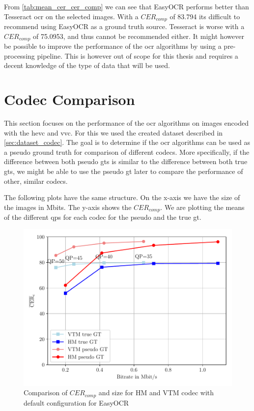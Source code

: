 From \autoref{tab:mean_cer_cer_comp} we can see that EasyOCR performs better than Tesseract \gls{ocr} on the selected images.
With a $CER_{comp}$ of 83.794 its difficult to recommend using EasyOCR as a ground truth source.
Tesseract is worse with a $CER_{comp}$ of 75.0953, and thus cannot be recommended either.
It might however be possible to improve the performance of the \gls{ocr} algorithms by using a pre-processing pipeline.
This is however out of scope for this thesis and requires a decent knowledge of the type of data that will be used.

\section{Codec Comparison}
\label{sec:codec_comparison}

This section focuses on the performance of the \gls{ocr} algorithms on images encoded with the \gls{hevc} and \gls{vvc}.
For this we used the created dataset described in \autoref{sec:dataset_codec}.
The goal is to determine if the \gls{ocr} algorithms can be used as a pseudo ground truth for comparison of different codecs.
More specifically, if the difference between both pseudo \glspl{gt} is similar to the difference between both true \glspl{gt}, we might be able to use the pseudo \gls{gt} later to compare the performance of other, similar codecs.

The following plots have the same structure.
On the x-axis we have the size of the images in Mbits.
The y-axis shows the $CER_{comp}$.
We are plotting the means of the different \glspl{qp} for each codec for the pseudo and the true \gls{gt}.


\begin{figure}[h]
    \centering
    \includegraphics[width=\textwidth]{../images/analyze/codec_cer_size_ezocr_default.pdf}
    \caption{Comparison of $CER_{comp}$ and size for HM and VTM codec with default configuration for EasyOCR}
    \label{fig:codec_cer_size_ezocr_default}
\end{figure}

